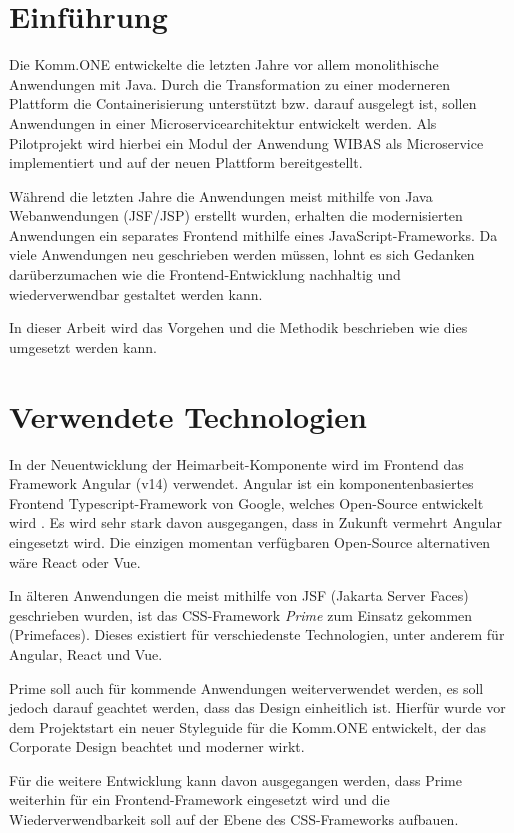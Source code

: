 \chapter{Einführung}

Die Komm.ONE entwickelte die letzten Jahre vor allem monolithische Anwendungen mit Java. Durch die Transformation zu einer moderneren Plattform die Containerisierung unterstützt bzw. darauf ausgelegt ist, sollen Anwendungen in einer Microservicearchitektur entwickelt werden. Als Pilotprojekt wird hierbei ein Modul der Anwendung WIBAS als Microservice implementiert und auf der neuen Plattform bereitgestellt.

Während die letzten Jahre die Anwendungen meist mithilfe von Java Webanwendungen (JSF/JSP) erstellt wurden, erhalten die modernisierten Anwendungen ein separates Frontend mithilfe eines JavaScript-Frameworks. Da viele Anwendungen neu geschrieben werden müssen, lohnt es sich Gedanken darüberzumachen wie die Frontend-Entwicklung nachhaltig und wiederverwendbar gestaltet werden kann.

In dieser Arbeit wird das Vorgehen und die Methodik beschrieben wie dies umgesetzt werden kann.

\chapter{Verwendete Technologien}

In der Neuentwicklung der Heimarbeit-Komponente wird im Frontend das Framework Angular (v14) verwendet. Angular ist ein komponentenbasiertes Frontend Typescript-Framework von Google, welches Open-Source entwickelt wird \cite{angular.17.01.2023}. Es wird sehr stark davon ausgegangen, dass in Zukunft vermehrt Angular eingesetzt wird. Die einzigen momentan verfügbaren Open-Source alternativen wäre React oder Vue.

In älteren Anwendungen die meist mithilfe von JSF (Jakarta Server Faces) geschrieben wurden, ist das CSS-Framework \textit{Prime} zum Einsatz gekommen (Primefaces). Dieses existiert für verschiedenste Technologien, unter anderem für Angular, React und Vue.

Prime soll auch für kommende Anwendungen weiterverwendet werden, es soll jedoch darauf geachtet werden, dass das Design einheitlich ist. Hierfür wurde vor dem Projektstart ein neuer Styleguide für die Komm.ONE entwickelt, der das Corporate Design beachtet und moderner wirkt.

Für die weitere Entwicklung kann davon ausgegangen werden, dass Prime weiterhin für ein Frontend-Framework eingesetzt wird und die Wiederverwendbarkeit soll auf der Ebene des CSS-Frameworks aufbauen. 

